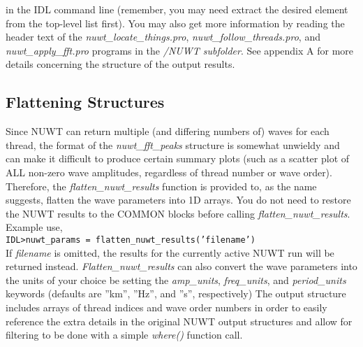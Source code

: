 \documentclass{article}
\begin{document}
in the IDL command line (remember, you may need extract the desired element from the top-level list first). You may also get more information by reading the header text of the \textit{nuwt\_locate\_things.pro}, \textit{nuwt\_follow\_threads.pro}, and \textit{nuwt\_apply\_fft.pro} programs in the \textit{/NUWT subfolder}. See appendix A for more details concerning the structure of the output results.\\

\subsection{Flattening Structures}
Since NUWT can return multiple (and differing numbers of) waves for each thread, the format of the \textit{nuwt\_fft\_peaks} structure is somewhat unwieldy and can make it difficult to produce certain summary plots (such as a scatter plot of ALL non-zero wave amplitudes, regardless of thread number or wave order). Therefore, the \textit{flatten\_nuwt\_results} function is provided to, as the name suggests, flatten the wave parameters into 1D arrays. You do not need to restore the NUWT results to the COMMON blocks before calling \textit{flatten\_nuwt\_results}. \\

Example use, \\

\hspace{0.5cm} \texttt{IDL\textgreater nuwt\_params = flatten\_nuwt\_results('filename')} \\


If \textit{filename} is omitted, the results for the currently active NUWT run will be returned instead. \textit{Flatten\_nuwt\_results} can also convert the wave parameters into the units of your choice be setting the \textit{amp\_units}, \textit{freq\_units}, and \textit{period\_units} keywords (defaults are ''km'', ''Hz'', and ''s'', respectively) The output structure includes arrays of thread indices and wave order numbers in order to easily reference the extra details in the original NUWT output structures and allow for filtering to be done with a simple \textit{where()} function call.


\end{document}
